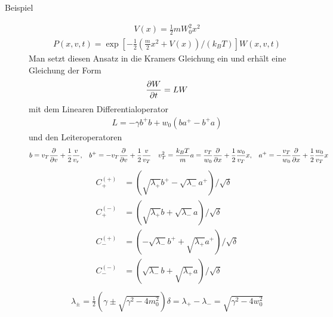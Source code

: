 \begin{itemize}
    \begin{description}
      \item[Beispiel]
        \begin{align*}
          V(x) = \frac{1}{2}m W_0^2 x^2
        \end{align*}
        \begin{align*}
          P(x, v, t) = \exp\left[ - \frac{1}{2} \left( \frac{m}{2}x^2 + V(x) \right)/(k_B T) \right]
          W(x, v, t)
        \end{align*}
        Man setzt diesen Ansatz in die Kramers Gleichung ein und erhält eine
        Gleichung der Form
        \begin{align*}
          \frac{\partial W }{\partial t} = L W
        \end{align*}
        mit dem Linearen Differentialoperator
        \begin{align*}
          L = - \gamma b^+ b + w_0 \left( b a^+ - b^+ a\right)
        \end{align*}
        und den Leiteroperatoren
        \begin{align*}
          b = v_T \frac{\partial  }{\partial v} + \frac{1}{2} \frac{v}{v_r}, && b^+ = - v_T \frac{\partial  }{\partial v} + \frac{1}{2} \frac{v}{v_T} && v_T^2 = \frac{k_B T}{m}
          a = \frac{v_T}{w_0} \frac{\partial  }{\partial x} + \frac{1}{2} \frac{w_0}{v_T} x, && a^+ = - \frac{v_T}{w_0} \frac{\partial  }{\partial x} + \frac{1}{2} \frac{w_0}{v_T} x
        \end{align*}
        \begin{align*}
          C_+^{(+)} & = \left( \sqrt{\lambda_+} b^+ - \sqrt{\lambda_-} a^+ \right)/\sqrt{\delta} \\
          C_+^{(-)} & = \left( \sqrt{\lambda_+} b   + \sqrt{\lambda_-} a   \right)/\sqrt{\delta} \\
          C_-^{(+)} & = \left(-\sqrt{\lambda_-} b^+ + \sqrt{\lambda_+} a^+ \right)/\sqrt{\delta} \\
          C_-^{(-)} & = \left( \sqrt{\lambda_-} b   + \sqrt{\lambda_+} a   \right)/\sqrt{\delta} \\
        \end{align*}
        \begin{align*}
          \lambda_{ \pm } = \frac{1}{2} \left( \gamma \pm \sqrt{\gamma^2 - 4 m_0 ^2 } \right)
          \delta = \lambda_+ - \lambda_- = \sqrt{\gamma^2 - 4 w_0^2}
        \end{align*}
        \begin{align*}

\end{align*}
\end{description}
\end{itemize}
